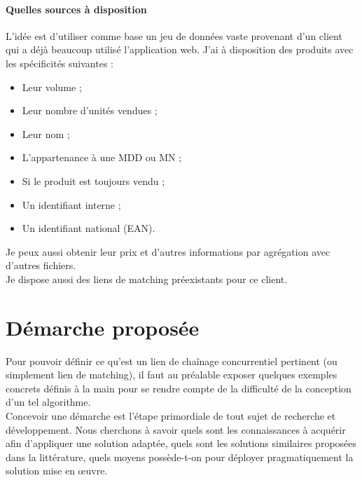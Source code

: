 \documentclass{rapportCS}
\begin{document}
\paragraph{Quelles sources à disposition} L'idée est d'utiliser comme base un jeu de données vaste provenant d'un
client qui a déjà beaucoup utilisé l'application web.
J'ai à disposition des produits avec les spécificités suivantes :
\begin{itemize}
  \item Leur volume ;
  \item Leur nombre d'unités vendues ;
  \item Leur nom ;
  \item L'appartenance à une MDD ou MN ;
  \item Si le produit est toujours vendu ;
  \item Un identifiant interne ;
  \item Un identifiant national (EAN).
\end{itemize}

Je peux aussi obtenir leur prix et d'autres informations par agrégation avec d'autres fichiers.\\

Je dispose aussi des liens de matching préexistants pour ce client.


\newpage

\section{Démarche proposée}

Pour pouvoir définir ce qu'est un lien de chaînage concurrentiel pertinent 
(ou simplement lien de matching), il faut au préalable exposer quelques exemples concrets 
définis à la main pour se rendre compte de la difficulté de la conception 
d'un tel algorithme. \\

Concevoir une démarche est l'étape primordiale de tout sujet de recherche et développement.
Nous cherchons à savoir quels sont les connaissances à acquérir afin d'appliquer une solution adaptée,
quels sont les solutions similaires proposées dans la littérature, quels moyens possède-t-on pour
déployer pragmatiquement la solution mise en œuvre.\\
\end{document}
